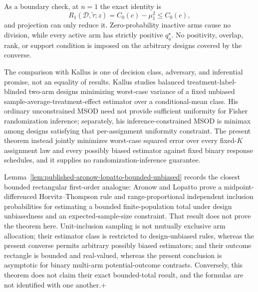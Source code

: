 As a boundary check, at \(n=1\) the exact identity is
\[
 R_1(\mathcal D,\widetilde\tau;z)=C_0(c)-\mu_1^2\leq C_0(c),
\]
and projection can only reduce it.  Zero-probability inactive arms cause no division, while every active arm has strictly positive \(q_a^\star\).  No positivity, overlap, rank, or support condition is imposed on the arbitrary designs covered by the converse.

The comparison with Kallus is one of decision class, adversary, and inferential promise, not an equality of results.  Kallus studies balanced treatment-label-blinded two-arm designs minimizing worst-case variance of a fixed unbiased sample-average-treatment-effect estimator over a conditional-mean class.  His ordinary unconstrained MSOD need not provide sufficient uniformity for Fisher randomization inference; separately, his inference-constrained MSOD is minimax among designs satisfying that per-assignment uniformity constraint.  The present theorem instead jointly minimizes worst-case squared error over every fixed-\(K\) assignment law and every possibly biased estimator against fixed binary response schedules, and it supplies no randomization-inference guarantee.

Lemma~\ref{lem:published-aronow-lopatto-bounded-unbiased} records the closest bounded rectangular first-order analogue: Aronow and Lopatto prove a midpoint-differenced Horvitz--Thompson rule and range-proportional independent inclusion probabilities for estimating a bounded finite-population total under design unbiasedness and an expected-sample-size constraint.  That result does not prove the theorem here.  Unit-inclusion sampling is not mutually exclusive arm allocation; their estimator class is restricted to design-unbiased rules, whereas the present converse permits arbitrary possibly biased estimators; and their outcome rectangle is bounded and real-valued, whereas the present conclusion is asymptotic for binary multi-arm potential-outcome contrasts.  Conversely, this theorem does not claim their exact bounded-total result, and the formulas are not identified with one another.+